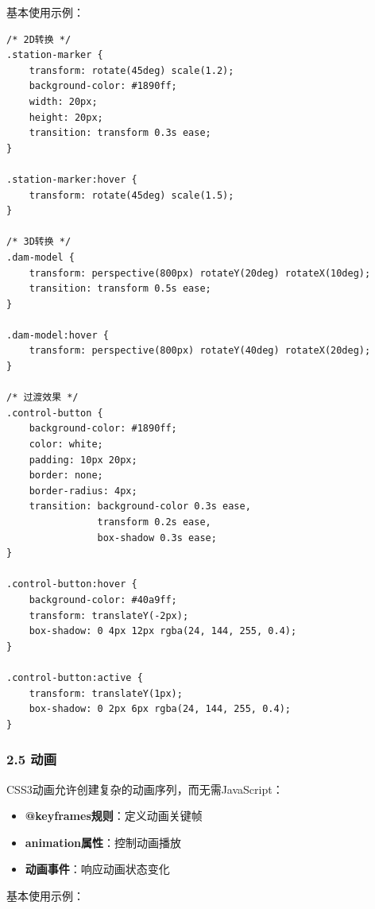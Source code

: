 基本使用示例：

\begin{lstlisting}
/* 2D转换 */
.station-marker {
    transform: rotate(45deg) scale(1.2);
    background-color: #1890ff;
    width: 20px;
    height: 20px;
    transition: transform 0.3s ease;
}

.station-marker:hover {
    transform: rotate(45deg) scale(1.5);
}

/* 3D转换 */
.dam-model {
    transform: perspective(800px) rotateY(20deg) rotateX(10deg);
    transition: transform 0.5s ease;
}

.dam-model:hover {
    transform: perspective(800px) rotateY(40deg) rotateX(20deg);
}

/* 过渡效果 */
.control-button {
    background-color: #1890ff;
    color: white;
    padding: 10px 20px;
    border: none;
    border-radius: 4px;
    transition: background-color 0.3s ease,
                transform 0.2s ease,
                box-shadow 0.3s ease;
}

.control-button:hover {
    background-color: #40a9ff;
    transform: translateY(-2px);
    box-shadow: 0 4px 12px rgba(24, 144, 255, 0.4);
}

.control-button:active {
    transform: translateY(1px);
    box-shadow: 0 2px 6px rgba(24, 144, 255, 0.4);
}
\end{lstlisting}

\subsubsection{2.5 动画}\label{ux52a8ux753b}

CSS3动画允许创建复杂的动画序列，而无需JavaScript：

\begin{itemize}
\tightlist
\item
  \textbf{@keyframes规则}：定义动画关键帧
\item
  \textbf{animation属性}：控制动画播放
\item
  \textbf{动画事件}：响应动画状态变化
\end{itemize}

基本使用示例：

